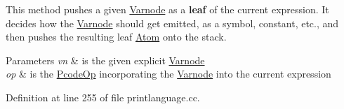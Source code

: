 This method pushes a given \mbox{\hyperlink{class_varnode}{Varnode}} as a {\bfseries{leaf}} of the current expression. It decides how the \mbox{\hyperlink{class_varnode}{Varnode}} should get emitted, as a symbol, constant, etc., and then pushes the resulting leaf \mbox{\hyperlink{struct_print_language_1_1_atom}{Atom}} onto the stack. 
\begin{DoxyParams}{Parameters}
{\em vn} & is the given explicit \mbox{\hyperlink{class_varnode}{Varnode}} \\
\hline
{\em op} & is the \mbox{\hyperlink{class_pcode_op}{Pcode\+Op}} incorporating the \mbox{\hyperlink{class_varnode}{Varnode}} into the current expression \\
\hline
\end{DoxyParams}


Definition at line 255 of file printlanguage.\+cc.

